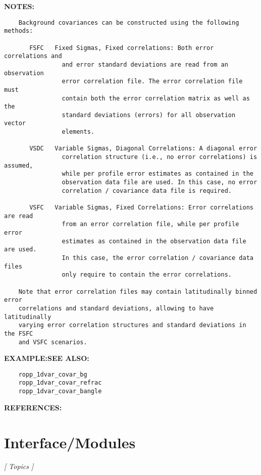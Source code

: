 \textbf{NOTES:}\hspace{0.08in}\begin{Verbatim}
    Background covariances can be constructed using the following methods:

       FSFC   Fixed Sigmas, Fixed correlations: Both error correlations and
                and error standard deviations are read from an observation
                error correlation file. The error correlation file must 
                contain both the error correlation matrix as well as the
                standard deviations (errors) for all observation vector
                elements.

       VSDC   Variable Sigmas, Diagonal Correlations: A diagonal error 
                correlation structure (i.e., no error correlations) is assumed,
                while per profile error estimates as contained in the 
                observation data file are used. In this case, no error 
                correlation / covariance data file is required.

       VSFC   Variable Sigmas, Fixed Correlations: Error correlations are read
                from an error correlation file, while per profile error 
                estimates as contained in the observation data file are used.
                In this case, the error correlation / covariance data files
                only require to contain the error correlations.

    Note that error correlation files may contain latitudinally binned error
    correlations and standard deviations, allowing to have latitudinally 
    varying error correlation structures and standard deviations in the FSFC  
    and VSFC scenarios.
\end{Verbatim}
\textbf{EXAMPLE:}\hspace{0.08in}\textbf{SEE ALSO:}\hspace{0.08in}\begin{Verbatim}
    ropp_1dvar_covar_bg
    ropp_1dvar_covar_refrac
    ropp_1dvar_covar_bangle
\end{Verbatim}
\textbf{REFERENCES:}\hspace{0.08in}\section{Interface/Modules}
\textsl{[ Topics ]}

